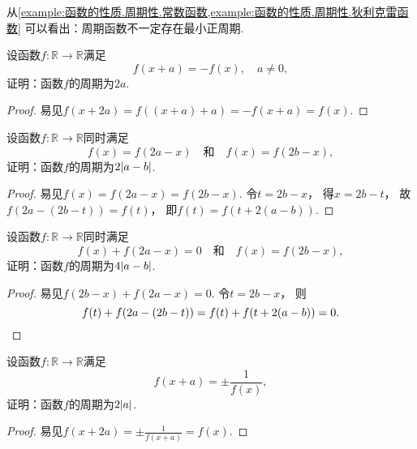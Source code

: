\begin{remark}
从\cref{example:函数的性质.周期性.常数函数,example:函数的性质.周期性.狄利克雷函数}
可以看出：周期函数不一定存在最小正周期.
\end{remark}

\begin{example}
设函数\(f\colon\mathbb{R}\to\mathbb{R}\)满足\[
	f(x+a) = -f(x),
	\quad a\neq0,
\]
证明：函数\(f\)的周期为\(2a\).
\begin{proof}
易见\(f(x+2a)
=f((x+a)+a)
=-f(x+a)
=f(x)\).
\end{proof}
\end{example}

\begin{example}
设函数\(f\colon\mathbb{R}\to\mathbb{R}\)同时满足\[
	f(x)=f(2a-x)
	\quad\text{和}\quad
	f(x)=f(2b-x),
\]
证明：函数\(f\)的周期为\(2\abs{a-b}\).
\begin{proof}
易见\(f(x)
=f(2a-x)
=f(2b-x)\).
令\(t=2b-x\)，
得\(x=2b-t\)，
故\(f(2a-(2b-t))=f(t)\)，
即\(f(t)=f(t+2(a-b))\).
\end{proof}
\end{example}

\begin{example}
设函数\(f\colon\mathbb{R}\to\mathbb{R}\)同时满足\[
	f(x)+f(2a-x)=0
	\quad\text{和}\quad
	f(x)=f(2b-x),
\]
证明：函数\(f\)的周期为\(4\abs{a-b}\).
\begin{proof}
易见\(f(2b-x)+f(2a-x)=0\).
令\(t=2b-x\)，
则\[
	f(t)+f(2a-(2b-t))
	=f(t)+f(t+2(a-b))
	=0.
	\qedhere
\]
\end{proof}
\end{example}

\begin{example}
设函数\(f\colon\mathbb{R}\to\mathbb{R}\)满足\[
	f(x+a)=\pm\frac1{f(x)},
\]
证明：函数\(f\)的周期为\(2\abs{a}\).
\begin{proof}
易见\(f(x+2a)=\pm\frac1{f(x+a)}=f(x)\).
\end{proof}
\end{example}
